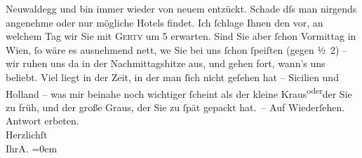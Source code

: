 \begin{ledgroupsized}[t]{13cm}
                  Neuwaldegg und bin immer wieder von neuem
               entzückt. Schade dſs man nirgends angenehme oder nur mögliche Hotels findet. Ich
               ſchlage Ihnen den \label{K_L01407-1v}\label{K_L01407-1h} vor,
               an welchem Tag wir Sie mit \textsc{Gerty} um 5 erwarten. Sind Sie aber {\pb}ſchon
                  Vormittag in Wien, ſo wäre es
               ausnehmend nett, we{\geminationn}{ }Sie bei uns ſchon ſpeiſten (gegen ½ 2)
               – wir ruhen uns da{\geminationn} in der Nachmittagshitze aus, und
               gehen fort, wann’s uns beliebt. Viel liegt in der Zeit, in der man ſich nicht geſehen
               hat – Sicilien und Holland – was mir beinahe noch wichtiger ſcheint als der
               kleine Kraus\substVorne{}\textsuperscript{oder}\substDazwischen{}der Sie zu früh, und\substHinten{} der große Graus, der Sie zu ſpät gepackt hat. –\pend
           \pstart
           Auf Wiederſehen. Antwort erbeten.{\\[\baselineskip]}Herzlichſt{\\[\baselineskip]}Ihr\spacefill\mbox{A.}\pend
           \leftskip=0em{}
         
         \endnumbering{}\end{ledgroupsized}  \newcommand{\dateiname}{L01407}\newcommand{\titel}{Arthur Schnitzler an Hugo von Hofmannsthal, [19.? 6. 1904]}\newcommand{\editorInnen}{Martin Anton Müller und Gerd-Hermann Susen}
      